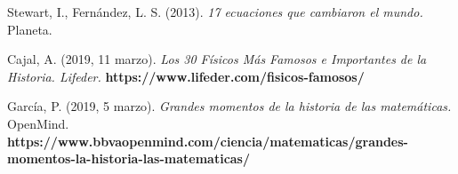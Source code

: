 \documentclass[10pt,a4paper]{article}
\begin{document}
\begin{thebibliography}{2}
 
	 Stewart, I., Fernández, L. S. (2013). 
\textit{17 ecuaciones que cambiaron el mundo.} Planeta.

	 Cajal, A. (2019, 11 marzo).\textit{ Los 30 Físicos Más Famosos e Importantes de la Historia. Lifeder.} \textbf{https://www.lifeder.com/fisicos-famosos/}

 García, P. (2019, 5 marzo). \textit{Grandes momentos de la historia de las matemáticas.} OpenMind. \textbf{https://www.bbvaopenmind.com/ciencia/matematicas/grandes-momentos-la-historia-las-matematicas/
}

 
\end{thebibliography}
\end{document}
